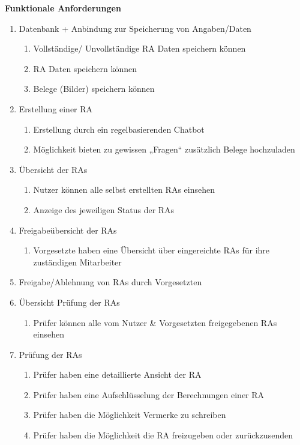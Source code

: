 \textbf{Funktionale Anforderungen}
\begin{enumerate}
	\item Datenbank + Anbindung zur Speicherung von Angaben/Daten
	\begin{enumerate}
		\item Vollständige/ Unvollständige RA Daten speichern können
		\item RA Daten speichern können
		\item Belege (Bilder) speichern können
	\end{enumerate}
	\item Erstellung einer RA
	\begin{enumerate}
		\item Erstellung durch ein regelbasierenden Chatbot
		\item Möglichkeit bieten zu gewissen „Fragen“ zusätzlich Belege hochzuladen
	\end{enumerate}
	\item Übersicht der RAs
	\begin{enumerate}
		\item Nutzer können alle selbst erstellten RAs einsehen
		\item Anzeige des jeweiligen Status der RAs
	\end{enumerate}
	\item Freigabeübersicht der RAs
	\begin{enumerate}
		\item Vorgesetzte haben eine Übersicht über eingereichte RAs für ihre zuständigen Mitarbeiter
	\end{enumerate}
	\item Freigabe/Ablehnung von RAs durch Vorgesetzten
	\item Übersicht Prüfung der RAs
	\begin{enumerate}
		\item Prüfer können alle vom Nutzer \& Vorgesetzten freigegebenen RAs einsehen
	\end{enumerate}
	\item Prüfung der RAs
	\begin{enumerate}
		\item Prüfer haben eine detaillierte Ansicht der RA
		\item Prüfer haben eine Aufschlüsselung der Berechnungen einer RA
		\item Prüfer haben die Möglichkeit Vermerke zu schreiben
		\item Prüfer haben die Möglichkeit die RA freizugeben oder zurückzusenden 
	\end{enumerate}

\end{enumerate}
